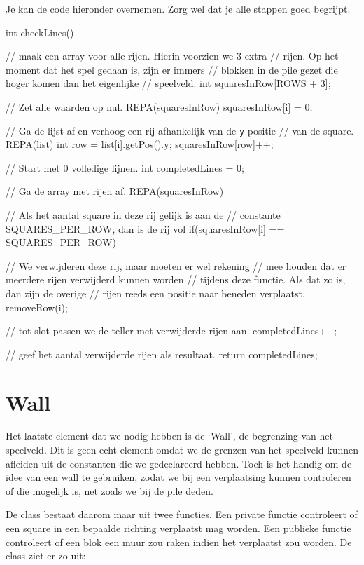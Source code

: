 Je kan de code hieronder overnemen. Zorg wel dat je alle stappen goed begrijpt.

\begin{code}
int checkLines()
{
	// maak een array voor alle rijen. Hierin voorzien we 3 extra 
	// rijen. Op het moment dat het spel gedaan is, zijn er immers
	// blokken in de pile gezet die hoger komen dan het eigenlijke 
	// speelveld.
	int squaresInRow[ROWS + 3];
	
	// Zet alle waarden op nul.
	REPA(squaresInRow) squaresInRow[i] = 0;
	
	// Ga de lijst af en verhoog een rij afhankelijk van de \verb|y| positie 
	// van de square.
	REPA(list)
	{
		 int row = list[i].getPos().y;
		 squaresInRow[row]++;
	}
	
	// Start met 0 volledige lijnen.
	int completedLines = 0;
	
	// Ga de array met rijen af.
	REPA(squaresInRow)
	{
		 // Als het aantal square in deze rij gelijk is aan de 
		 // constante SQUARES_PER_ROW, dan is de rij vol
		 if(squaresInRow[i] == SQUARES_PER_ROW)
		 {
				// We verwijderen deze rij, maar moeten er wel rekening
				// mee houden dat er meerdere rijen verwijderd kunnen worden
				// tijdens deze functie. Als dat zo is, dan zijn de overige
				// rijen reeds een positie naar beneden verplaatst.
				removeRow(i);
				
				// tot slot passen we de teller met verwijderde rijen aan.
				completedLines++;           
		 }
	}
	
	// geef het aantal verwijderde rijen als resultaat.
	return completedLines;
}
\end{code}

\section{Wall}
Het laatste element dat we nodig hebben is de `Wall', de begrenzing van het speelveld. Dit is geen echt element omdat we de grenzen van het speelveld kunnen afleiden uit de constanten die we gedeclareerd hebben. Toch is het handig om de idee van een wall te gebruiken, zodat we bij een verplaatsing kunnen controleren of die mogelijk is, net zoals we bij de pile deden.

De class bestaat daarom maar uit twee functies. Een private functie  controleert of een square in een bepaalde richting verplaatst mag worden. Een publieke functie  controleert of een blok een muur zou raken indien het verplaatst zou worden. De class ziet er zo uit:

